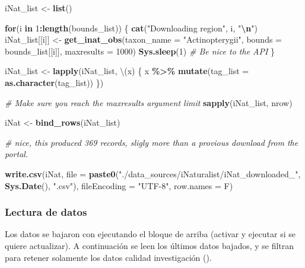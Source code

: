 \documentclass[sn-apa,pdflatex]{sn-jnl}
\newenvironment{Shaded}{\begin{snugshade}}{\end{snugshade}}
\newcommand{\AttributeTok}[1]{\textcolor[rgb]{0.13,0.29,0.53}{#1}}
\newcommand{\CommentTok}[1]{\textcolor[rgb]{0.56,0.35,0.01}{\textit{#1}}}
\newcommand{\ControlFlowTok}[1]{\textcolor[rgb]{0.13,0.29,0.53}{\textbf{#1}}}
\newcommand{\DecValTok}[1]{\textcolor[rgb]{0.00,0.00,0.81}{#1}}
\newcommand{\FunctionTok}[1]{\textcolor[rgb]{0.13,0.29,0.53}{\textbf{#1}}}
\newcommand{\NormalTok}[1]{#1}
\newcommand{\OtherTok}[1]{\textcolor[rgb]{0.56,0.35,0.01}{#1}}
\newcommand{\SpecialCharTok}[1]{\textcolor[rgb]{0.81,0.36,0.00}{\textbf{#1}}}
\newcommand{\StringTok}[1]{\textcolor[rgb]{0.31,0.60,0.02}{#1}}
\begin{document}
\begin{Shaded}
\begin{Highlighting}[]
\NormalTok{iNat\_list }\OtherTok{\textless{}{-}} \FunctionTok{list}\NormalTok{()}

\ControlFlowTok{for}\NormalTok{(i }\ControlFlowTok{in} \DecValTok{1}\SpecialCharTok{:}\FunctionTok{length}\NormalTok{(bounds\_list)) \{}
  \FunctionTok{cat}\NormalTok{(}\StringTok{"Downloading region"}\NormalTok{, i, }\StringTok{"}\SpecialCharTok{\textbackslash{}n}\StringTok{"}\NormalTok{)}
\NormalTok{  iNat\_list[[i]] }\OtherTok{\textless{}{-}} \FunctionTok{get\_inat\_obs}\NormalTok{(}\AttributeTok{taxon\_name =} \StringTok{"Actinopterygii"}\NormalTok{, }\AttributeTok{bounds =}\NormalTok{ bounds\_list[[i]], }\AttributeTok{maxresults =} \DecValTok{1000}\NormalTok{) }
  \FunctionTok{Sys.sleep}\NormalTok{(}\DecValTok{1}\NormalTok{)  }\CommentTok{\# Be nice to the API}
\NormalTok{\}}

\NormalTok{iNat\_list }\OtherTok{\textless{}{-}} \FunctionTok{lapply}\NormalTok{(iNat\_list, \textbackslash{}(x) \{ x }\SpecialCharTok{\%\textgreater{}\%} \FunctionTok{mutate}\NormalTok{(}\AttributeTok{tag\_list =} \FunctionTok{as.character}\NormalTok{(tag\_list)) \})}

\CommentTok{\# Make sure you reach the maxresults argument limit }
\FunctionTok{sapply}\NormalTok{(iNat\_list, nrow)}

\NormalTok{iNat }\OtherTok{\textless{}{-}} \FunctionTok{bind\_rows}\NormalTok{(iNat\_list)}

\CommentTok{\# nice, this produced 369 records, sligly more than a provious download from the portal.  }

\FunctionTok{write.csv}\NormalTok{(iNat, }\AttributeTok{file =} \FunctionTok{paste0}\NormalTok{(}\StringTok{"./data\_sources/iNaturalist/iNat\_downloaded\_"}\NormalTok{, }\FunctionTok{Sys.Date}\NormalTok{(), }\StringTok{".csv"}\NormalTok{), }\AttributeTok{fileEncoding =} \StringTok{"UTF{-}8"}\NormalTok{, }\AttributeTok{row.names =}\NormalTok{ F)}
\end{Highlighting}
\end{Shaded}

\subsubsection{Lectura de datos}\label{lectura-de-datos-6}

Los datos se bajaron con ejecutando el bloque de arriba (activar y
ejecutar si se quiere actualizar). A continuación se leen los últimos
datos bajados, y se filtran para retener solamente los datos calidad
investigación ().
\end{document}
